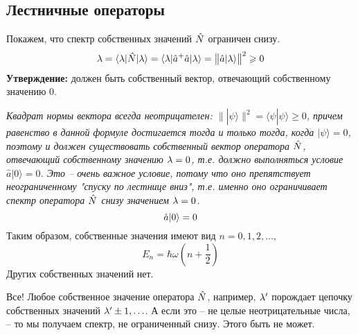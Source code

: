 \subsection{Лестничные операторы}
Покажем, что спектр собственных значений $\Hat N$ ограничен снизу.
$$
    \lambda = { \langle \lambda |\Hat N| \lambda \rangle } = { \langle \lambda |\hat a^+ \hat a| \lambda \rangle } = \big\| \hat a | \lambda \rangle  \big\|^2 \geqslant 0
$$
\textbf{Утверждение:} должен быть собственный вектор, отвечающий собственному значению 0.

\textsl{Квадрат нормы вектора всегда неотрицателен: $\||\psi\rangle\|^2=\langle\psi|\psi\rangle\geqslant0$, причем равенство в данной формуле достигается тогда и только тогда, когда $|\psi\rangle=0$, поэтому и должен
существовать собственный вектор оператора ${\Hat N}$, отвечающий собственному значению $\lambda =0$, т.е. должно выполняться условие $\hat{ a}|0\rangle=0$. Это -- очень важное условие, потому что оно препятствует неограниченному "спуску по лестнице вниз"{}, т.е. именно оно ограничивает спектр оператора ${\Hat N}$ снизу значением $\lambda =0$.}
$$
    \hat a | 0 \rangle = 0
$$
Таким образом, собственные значения имеют вид $n = 0, 1, 2, \ldots$,
$$
    E_n = \hbar \omega \left( n + \dfrac12 \right)
$$
Других собственных значений нет.

\Ans Все! Любое собственное значение оператора ${\Hat N}$, например,  $\lambda'$ порождает цепочку собственных значений $\lambda' \pm 1, \ldots$. А если это -- не целые неотрицательные числа, -- то мы получаем спектр, не ограниченный снизу. Этого быть не может.

